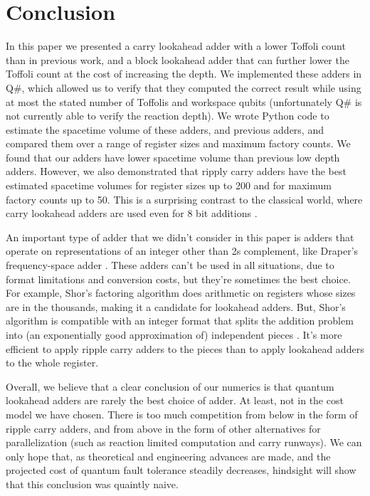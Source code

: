 \documentclass[onecolumn,unpublished]{quantumarticle}
\theoremstyle{definition}
\theoremstyle{definition}
\theoremstyle{definition}
\begin{document}
\section{Conclusion}
\label{sec:conclusion}

In this paper we presented a carry lookahead adder with a lower Toffoli count than in previous work, and a block lookahead adder that can further lower the Toffoli count at the cost of increasing the depth.
We implemented these adders in Q\#, which allowed us to verify that they computed the correct result while using at most the stated number of Toffolis and workspace qubits (unfortunately Q\# is not currently able to verify the reaction depth).
We wrote Python code to estimate the spacetime volume of these adders, and previous adders, and compared them over a range of register sizes and maximum factory counts.
We found that our adders have lower spacetime volume than previous low depth adders.
However, we also demonstrated that ripply carry adders have the best estimated spacetime volumes for register sizes up to 200 and for maximum factory counts up to 50.
This is a surprising contrast to the classical world, where carry lookahead adders are used even for 8 bit additions \cite{shirriff2020reverseengineer8008}.

An important type of adder that we didn't consider in this paper is adders that operate on representations of an integer other than 2s complement, like Draper's frequency-space adder \cite{draper2000qftaddition}.
These adders can't be used in all situations, due to format limitations and conversion costs, but they're sometimes the best choice.
For example, Shor's factoring algorithm \cite{shor1994algorithms} does arithmetic on registers whose sizes are in the thousands, making it a candidate for lookahead adders.
But, Shor's algorithm is compatible with an integer format that splits the addition problem into (an exponentially good approximation of) independent pieces \cite{gidney2019approximate,gidney2019factor}.
It's more efficient to apply ripple carry adders to the pieces than to apply lookahead adders to the whole register.

Overall, we believe that a clear conclusion of our numerics is that quantum lookahead adders are rarely the best choice of adder.
At least, not in the cost model we have chosen.
There is too much competition from below in the form of ripple carry adders, and from above in the form of other alternatives for parallelization (such as reaction limited computation and carry runways).
We can only hope that, as theoretical and engineering advances are made, and the projected cost of quantum fault tolerance steadily decreases, hindsight will show that this conclusion was quaintly naive.
\end{document}
